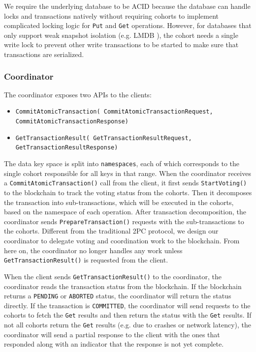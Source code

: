 \documentclass[11pt,sigplan,screen,nonacm]{acmart}
\begin{document}
We require the underlying database to be ACID because the database can handle locks and transactions natively without requiring cohorts to implement complicated locking logic for \texttt{Put} and \texttt{Get} operations. However, for databases that only support weak snapshot isolation (e.g. LMDB \cite{henry2019howard}), the cohort needs a single write lock to prevent other write transactions to be started to make sure that transactions are serialized. 

\subsubsection{Coordinator} \label{coordinator}
The coordinator exposes two APIs to the clients:
\begin{itemize}
  \item \texttt{CommitAtomicTransaction( CommitAtomicTransactionRequest, CommitAtomicTransactionResponse)}
  \item \texttt{GetTransactionResult( GetTransactionResultRequest, GetTransactionResultResponse)}
\end{itemize}   

The data key space is split into \texttt{namespaces}, each of which corresponds to the single cohort responsible for all keys in that range. When the coordinator receives a \texttt{CommitAtomicTransaction()} call from the client, it first sends \texttt{StartVoting()} to the blockchain to track the voting status from the cohorts. Then it decomposes the transaction into sub-transactions, which will be executed in the cohorts, based on the namespace of each operation. After transaction decomposition, the coordinator sends \texttt{PrepareTransaction()} requests with the sub-transactions to the cohorts. Different from the traditional 2PC protocol, we design our coordinator to delegate voting and coordination work to the blockchain. From here on, the coordinator no longer handles any work unless \texttt{GetTransactionResult()} is requested from the client.

When the client sends \texttt{GetTransactionResult()} to the coordinator, the coordinator reads the transaction status from the blockchain. If the blockchain returns a \texttt{PENDING} or \texttt{ABORTED} status, the coordinator will return the status directly. If the transaction is \texttt{COMMITTED}, the coordinator will send requests to the cohorts to fetch the \texttt{Get} results and then return the status with the \texttt{Get} results. If not all cohorts return the \texttt{Get} results (e.g. due to crashes or network latency), the coordinator will send a partial response to the client with the ones that responded along with an indicator that the response is not yet complete.
\end{document}
